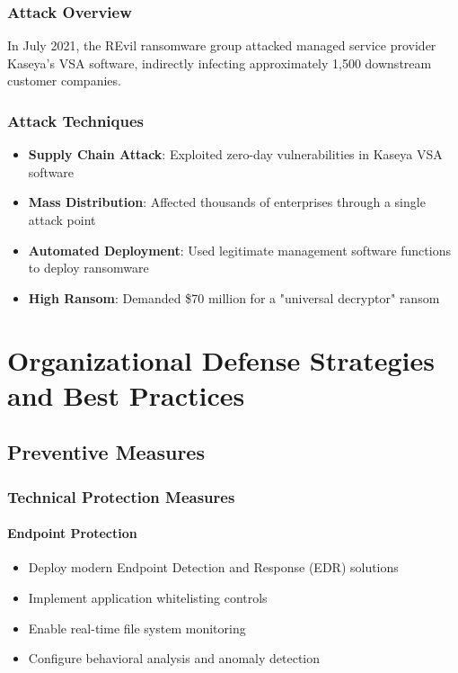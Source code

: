 \documentclass[12pt,a4paper]{article}
\begin{document}
\subsubsection{Attack Overview}
In July 2021, the REvil ransomware group attacked managed service provider Kaseya's VSA software, indirectly infecting approximately 1,500 downstream customer companies.

\subsubsection{Attack Techniques}
\begin{itemize}
    \item \textbf{Supply Chain Attack}: Exploited zero-day vulnerabilities in Kaseya VSA software
    \item \textbf{Mass Distribution}: Affected thousands of enterprises through a single attack point
    \item \textbf{Automated Deployment}: Used legitimate management software functions to deploy ransomware
    \item \textbf{High Ransom}: Demanded \$70 million for a "universal decryptor" ransom
\end{itemize}

\section{Organizational Defense Strategies and Best Practices}

\subsection{Preventive Measures}

\subsubsection{Technical Protection Measures}

\paragraph{Endpoint Protection}
\begin{itemize}
    \item Deploy modern Endpoint Detection and Response (EDR) solutions
    \item Implement application whitelisting controls
    \item Enable real-time file system monitoring
    \item Configure behavioral analysis and anomaly detection
\end{itemize}
\end{document}
